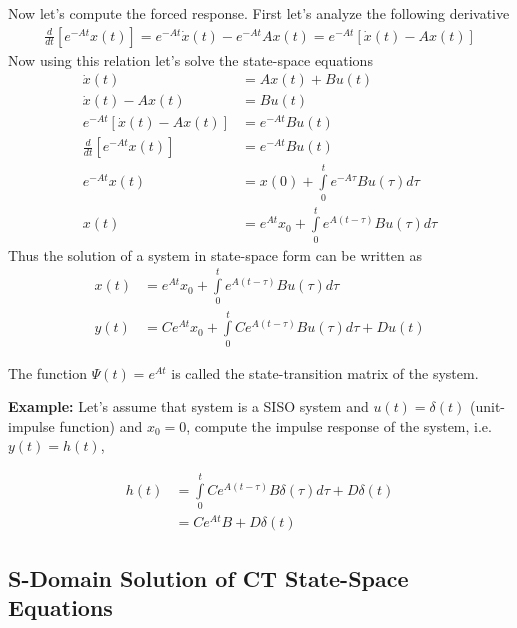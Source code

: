 \documentclass[twoside]{article}
\begin{document}
Now let's compute the forced response. First let's analyze the
following derivative
%
\begin{align*}
\frac{d}{dt} \left[ e^{-A t} x(t) \right] = e^{-A t} \dot{x}(t) - e^{-A t} A
  x(t) = e^{-A t} \left[ \dot{x}(t) - A x(t) \right]
\end{align*}
%
Now using this relation let's solve the state-space equations
%
\begin{align*}
  \dot{x}(t) &= A x(t) + B u(t)
\\ 
  \dot{x}(t) - A x(t) &=  B u(t)
\\
  e^{-A t}  \left[ \dot{x}(t) - A x(t) \right] &=  e^{-A t} B u(t)
\\
  \frac{d}{dt} \left[ e^{-A t} x(t) \right] &=  e^{-A t} B u(t)
\\
  e^{-A t} x(t) &= x(0) + \int\limits_{0}^{t} e^{-A \tau} B u(\tau) d
                  \tau
\\
x(t) &= e^{A t} x_0 + \int\limits_{0}^{t} e^{A ( t - \tau ) } B u(\tau) d
                  \tau
\end{align*}
%
Thus the solution of a system in state-space form can be written as
%
\begin{align*}
  x(t) &= e^{A t} x_0 + \int\limits_{0}^{t} e^{A ( t - \tau ) } B u(\tau) d
                  \tau
\\
  y(t) &= C e^{A t} x_0 + \int\limits_{0}^{t} C e^{A ( t - \tau ) } B u(\tau) d
                  \tau + D u(t)
\end{align*}
%

The function $\Psi(t) = e^{A t}$ is called the state-transition matrix
of the system. 

\textbf{Example:} Let's assume that system is a SISO system and
$u(t) = \delta({t})$ (unit-impulse function) and $x_0 = 0$, compute 
the impulse response of the system, i.e. $y(t) = h(t)$,

\begin{align*}
  h(t) &= \int\limits_{0}^{t} C e^{A ( t - \tau ) } B \delta(\tau) d
                  \tau + D \delta(t)
\\
   &= C e^{A t } B + D \delta(t)
\end{align*}

\subsection*{S-Domain Solution of CT State-Space Equations}
\end{document}
